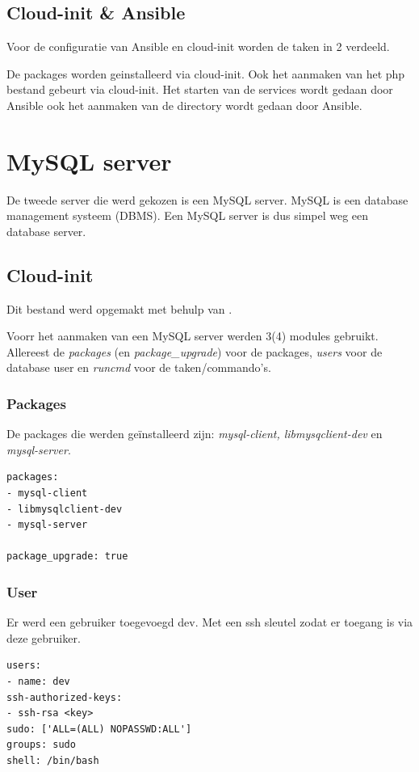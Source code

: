 \newpage
\subsection{Cloud-init \& Ansible}
\label{ch:cloudansiserverconf}
Voor de configuratie van Ansible en cloud-init worden de taken in 2 verdeeld. 

De packages worden geinstalleerd via cloud-init. Ook het aanmaken van het php bestand gebeurt via cloud-init. Het starten van de services wordt gedaan door Ansible ook het aanmaken van de directory wordt gedaan door Ansible.

\section{MySQL server}
De tweede server die werd gekozen is een MySQL server. MySQL is een database management systeem (DBMS). Een MySQL server is dus simpel weg een database server.

\subsection{Cloud-init}
Dit bestand werd opgemakt met behulp van \autocite{dias}.

Voorr het aanmaken van een MySQL server werden 3(4) modules gebruikt. Allereest de \textit{packages} (en \textit{package\_upgrade}) voor de packages, \textit{users} voor de database user en \textit{runcmd} voor de taken/commando's.

\subsubsection{Packages}
De packages die werden geïnstalleerd zijn: \textit{mysql-client, libmysqclient-dev} en \textit{mysql-server}.
\begin{lstlisting}[basicstyle=\small]
packages:
- mysql-client
- libmysqlclient-dev
- mysql-server

package_upgrade: true
\end{lstlisting}

\subsubsection{User}
Er werd een gebruiker toegevoegd dev. Met een ssh sleutel zodat er toegang is via deze gebruiker.
\begin{lstlisting}[basicstyle=\small]
users:
- name: dev
ssh-authorized-keys:
- ssh-rsa <key>
sudo: ['ALL=(ALL) NOPASSWD:ALL']
groups: sudo
shell: /bin/bash
\end{lstlisting}

